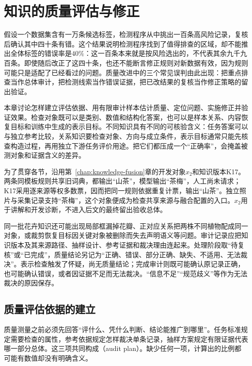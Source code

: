 \chapter{知识的质量评估与修正}
\label{chap:knowledge-quality-assessment-correction}

假设一个数据集含有一万条候选标签，检测程序从中挑出一百条高风险记录，复核后确认其中四十条有错。这个结果说明检测程序找到了值得排查的区域，却不能推出全体标签的错误率是$40\%$：这一百条本来就是按风险选出的，不代表其余九千九百条。即使随后改正了这四十条，也还不能断言修正规则对新数据有效，因为规则可能只是适配了已经看过的问题。质量改进中的三个常见误判由此出现：把重点排查当作总体审计，把检测线索当作错误证据，把已改结果的复核当作修正策略的留出验证。

本章讨论怎样建立评估依据、用有限审计样本估计质量、定位问题、实施修正并验证效果。检查对象既可以是类别、数值和结构化答案，也可以是样本关系、内容恢复目标和训练中生成的表示目标。不同知识具有不同的可核验含义：任务答案可以与独立参考比较，关系知识要检查对象、方向与成立条件，表示目标通常只能先核查构造过程，再用独立下游任务评价用途。把它们都压成一个“正确率”，会掩盖被测对象和证据含义的差异。

为了贯穿各节，沿用第~\ref{chap:knowledge-fusion}章的开发对象$x_2$和知识版本K17。两条同模板规则共享旧词典，都输出“山茶”，模型输出“茶梅”，人工尚未请求；K17采用逐来源等权多数票，因而把同一规则依据重复计票，输出“山茶”。独立照片与采集记录支持“茶梅”，这个对象便成为检查共享来源与融合配置的入口。$x_2$用于讲解和开发诊断，不进入后文的最终留出验收总体。

同一批花卉知识还可能出现局部框漏掉花瓣、正对应关系把两株不同植物配成同一对象，或裁剪恢复目标因关键对象被删除而失去声明语义等问题。审计记录应把知识版本及其来源路径、抽样设计、参考证据和裁决理由连起来。处理阶段取“待复核”或“已完成”，质量结论另记为“正确、错误、部分正确、缺失、不适用、无法裁决”。表示检查触发了怀疑，尚无质量结论；完成审计则既可能确认原记录正确，也可能确认错误，或者因证据不足而无法裁决。“信息不足”“规范歧义”等作为无法裁决的原因保存。

\section{质量评估依据的建立}
\label{sec:knowledge-quality-assessment-correction-basis}

质量测量之前必须先回答“评什么、凭什么判断、结论能推广到哪里”。任务标准规定需要检查的属性，参考依据规定怎样裁决单条记录，抽样方案规定有限证据代表哪一部分总体。这三项共同构成（audit plan）。缺少任何一项，计算出的比例都可能有数值却没有明确含义。

